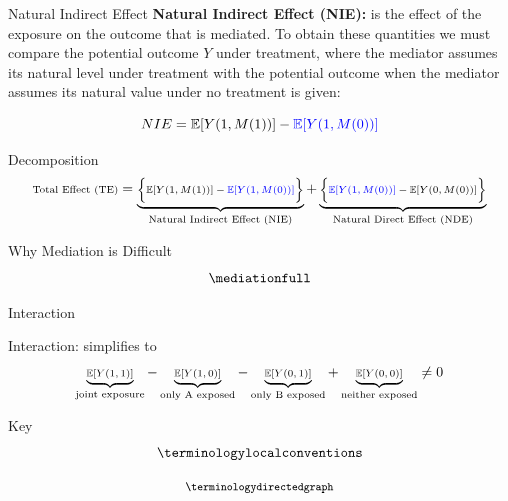 \documentclass[
  ignorenonframetext,
  aspectratio=169,
]{beamer}
\begin{document}
\begin{frame}{Natural Indirect Effect}
\label{natural-indirect-effect}
\textbf{Natural Indirect Effect (NIE):} is the effect of the exposure on
the outcome that is mediated. To obtain these quantities we must compare
the potential outcome \(Y\) under treatment, where the mediator assumes
its natural level under treatment with the potential outcome when the
mediator assumes its natural value under no treatment is given:

\[
 NIE = \mathbb{E}[Y(1, M(1))] - \textcolor{blue}{\mathbb{E}[Y(1, M(0))]}
\]
\end{frame}

\begin{frame}{Decomposition}
\label{decomposition}
\[
\scriptsize{ \text{Total Effect (TE)} = \underbrace{\bigg\{\mathbb{E}[Y(1, M(1))] - \textcolor{blue}{\mathbb{E}[Y(1, M(0))]}\bigg\}}_{\text{Natural Indirect Effect (NIE)}} + \underbrace{\bigg\{\textcolor{blue}{\mathbb{E}[Y(1, M(0))]} - \mathbb{E}[Y(0, M(0))]\bigg\}}_{\text{Natural Direct Effect (NDE)}}}
\]
\end{frame}

\begin{frame}{Why Mediation is Difficult}
\label{why-mediation-is-difficult}
\[
\mediationfull
\]
\end{frame}

\begin{frame}{Interaction}
\label{interaction}
\end{frame}

\begin{frame}{Interaction: simplifies to}
\label{interaction-simplifies-to}
\[\scriptsize{\underbrace{\mathbb{E}[Y(1,1)]}_{\text{joint exposure}} - \underbrace{\mathbb{E}[Y(1,0)]}_{\text{only A exposed}} - \underbrace{\mathbb{E}[Y(0,1)]}_{\text{only B exposed}} + \underbrace{\mathbb{E}[Y(0,0)]}_{\text{neither exposed}} \neq 0} \]
\end{frame}

\begin{frame}{Key}
\label{key}
\[\terminologylocalconventions\]
\end{frame}

\begin{frame}
\begin{adjustbox}{height=0.5\textheight, keepaspectratio}
$$
\footnotesize \terminologydirectedgraph
$$
\end{adjustbox}
\end{frame}
\end{document}
